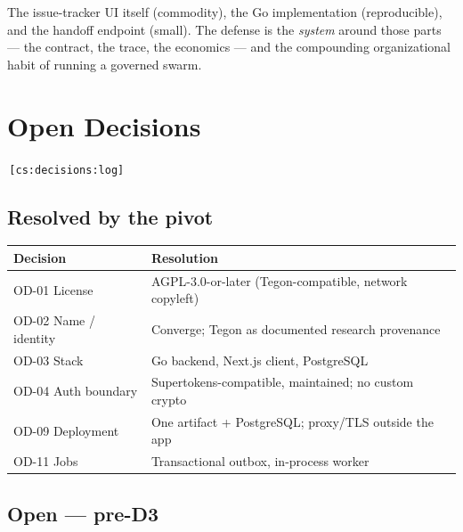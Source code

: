 \documentclass[11pt,a4paper]{report}
\newcommand{\cs}[1]{\,\texttt{\scriptsize[cs:#1]}\label{cs:#1}}
\begin{document}
The issue-tracker UI itself (commodity), the Go implementation
(reproducible), and the handoff endpoint (small). The defense is the
\emph{system} around those parts --- the contract, the trace, the
economics --- and the compounding organizational habit of running a
governed swarm.

\chapter{Open Decisions}
\label{ch:decisions}

\cs{decisions:log}

\section{Resolved by the pivot}

\begin{center}
\begin{tabular}{@{}ll@{}}
\toprule
\textbf{Decision} & \textbf{Resolution}\\
\midrule
OD-01 License & AGPL-3.0-or-later (Tegon-compatible, network copyleft)\\
OD-02 Name / identity & Converge; Tegon as documented research provenance\\
OD-03 Stack & Go backend, Next.js client, PostgreSQL\\
OD-04 Auth boundary & Supertokens-compatible, maintained; no custom crypto\\
OD-09 Deployment & One artifact + PostgreSQL; proxy/TLS outside the app\\
OD-11 Jobs & Transactional outbox, in-process worker\\
\bottomrule
\end{tabular}
\end{center}

\section{Open --- pre-D3}
\end{document}
